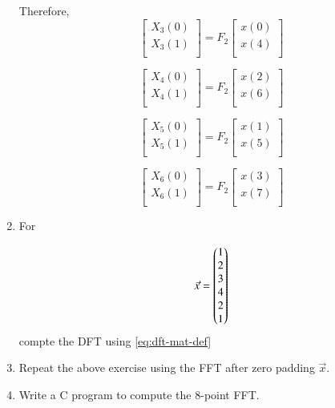\documentclass[journal,12pt,twocolumn]{IEEEtran}
\renewcommand\thesection{\arabic{section}}
\begin{document}
\begin{enumerate}[label=\arabic*.,ref=\thesection.\theenumi]
	Therefore,
	\begin{equation}
		\begin{bmatrix}
			X_{3}(0) \\ 
			X_{3}(1)\\ 
		\end{bmatrix}
		= F_{2}
		\begin{bmatrix}
			x(0) \\ 
			x(4) \\ 
		\end{bmatrix}
	\end{equation}
	
	\begin{equation}
		\begin{bmatrix}
			X_{4}(0) \\ 
			X_{4}(1)\\ 
		\end{bmatrix}
		= F_{2}
		\begin{bmatrix}
			x(2) \\ 
			x(6) \\ 
		\end{bmatrix}
	\end{equation}
	
	\begin{equation}
		\begin{bmatrix}
			X_{5}(0) \\ 
			X_{5}(1)\\ 
		\end{bmatrix}
		= F_{2}
		\begin{bmatrix}
			x(1) \\ 
			x(5) \\ 
		\end{bmatrix}
	\end{equation}
	
	\begin{equation}
		\begin{bmatrix}
			X_{6}(0) \\ 
			X_{6}(1)\\ 
		\end{bmatrix}
		= F_{2}
		\begin{bmatrix}
			x(3) \\ 
			x(7) \\ 
		\end{bmatrix}
	\end{equation}
	
	\item For 
	
	\begin{align}
		\vec{x} = \begin{pmatrix}1\\2\\3\\4\\2\\1\end{pmatrix}
		\label{eq:equation1}
	\end{align}
	compte the DFT  
	using 
	\eqref{eq:dft-mat-def}
	\item Repeat the above exercise using the FFT
	after zero padding $\vec{x}$.
	\item Write a C program to compute the 8-point FFT. 
\end{enumerate}
\end{document}
